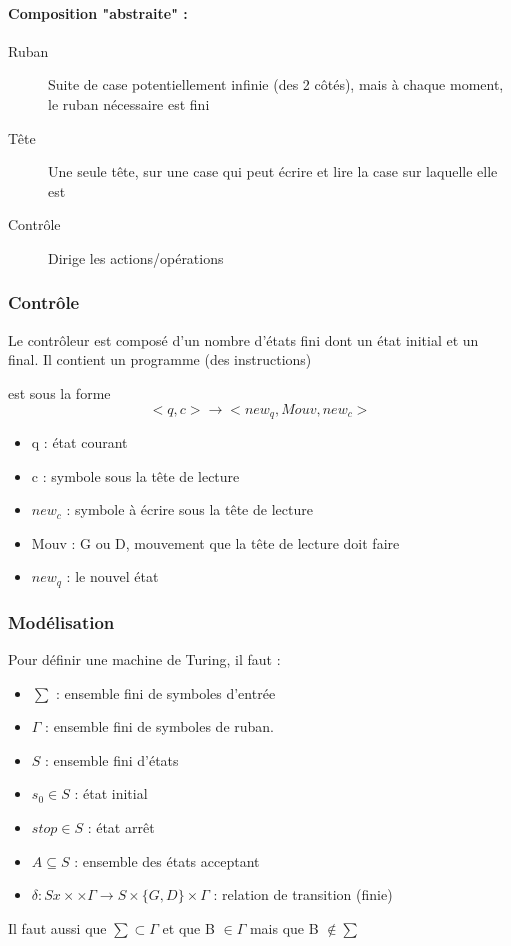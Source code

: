 \paragraph{Composition "abstraite" :}

\begin{description}
	\item[Ruban] Suite de case potentiellement infinie (des 2 côtés), mais à 
		chaque moment, le ruban nécessaire est fini
	\item[Tête] Une seule tête, sur une case qui peut écrire et lire la 
		case sur laquelle elle est
	\item[Contrôle] Dirige les actions/opérations
\end{description}

\subsubsection{Contrôle}
\label{ssub:contr_le}
Le contrôleur est composé d'un nombre d'états fini dont un état initial et un 
final. Il contient un programme (des instructions)

\begin{mydef} est sous la forme 
	$$<q,c> \rightarrow <new_q, Mouv, new_c>$$
	\begin{itemize}
		\item q : état courant
		\item c : symbole sous la tête de lecture
		\item $new_c$ : symbole à écrire sous la tête de lecture
		\item Mouv : G ou D, mouvement que la tête de lecture doit faire
		\item $new_q$ : le nouvel état
	\end{itemize}
\end{mydef}


\subsubsection{Modélisation}
Pour définir une machine de Turing, il faut :
\begin{itemize}
	\item $\sum$ : ensemble fini de symboles d'entrée
	\item $\Gamma$ : ensemble fini de symboles de ruban.
	\item $S$ : ensemble fini d'états
	\item $s_0 \in S$ : état initial
	\item $stop \in S$ : état arrêt
	\item $A \subseteq S$ : ensemble des états acceptant
	\item $\delta : Sx\times \times \Gamma \rightarrow S \times \{G,D\} 
	\times \Gamma$ : relation de transition (finie)
\end{itemize}
Il faut aussi que $\sum \subset \Gamma$ et que B $\in \Gamma$ mais que B 
$\notin \sum$

